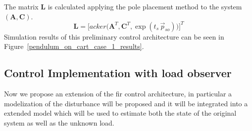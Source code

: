 \documentclass[11pt,a4paper,oneside]{book}
\numberwithin{equation}{section}
\theoremstyle{it}
\theoremstyle{definition}
\begin{document}
The matrix $\mathbf{L}$ is calculated applying the pole placement method to the 
system $(\mathbf{A},\mathbf{C})$.
\begin{equation}
	\mathbf{L} = 
	\Bigg[acker\Big(\mathbf{A}^T,\mathbf{C}^T,\exp(t_s\,\vec{p}_{so})\Big)\Bigg]^T
\end{equation}
Simulation results of this preliminary control architecture can be seen in Figure~\ref{pendulum_on_cart_case_1_results}.

\subsection{Control Implementation with load observer}
Now we propose an extension of the fir control architecture, in particular a modelization of the disturbance will be proposed and it will be integrated into a extended model which will be used to estimate both the state of the original system as well as the unknown load. 
\end{document}
